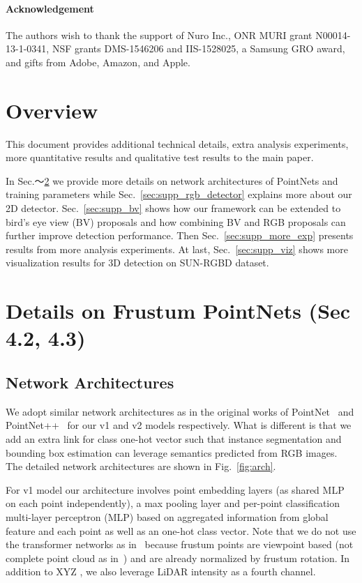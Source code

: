 \documentclass[10pt,twocolumn,letterpaper]{article}
\begin{document}
\paragraph{Acknowledgement}
The authors wish to thank the support of Nuro Inc., ONR MURI grant N00014-13-1-0341, NSF grants DMS-1546206 and  IIS-1528025, a Samsung GRO award, and gifts from Adobe, Amazon, and Apple.



\newpage
{\small


}

\newpage
\appendix
\section{Overview}
This document provides additional technical details, extra analysis experiments, more quantitative results and qualitative test results to the main paper.

In Sec.～\ref{sec:supp_pointnets} we provide more details on network architectures of PointNets and training parameters while Sec.~\ref{sec:supp_rgb_detector} explains more about our 2D detector. Sec.~\ref{sec:supp_bv} shows how our framework can be extended to bird's eye view (BV) proposals and how combining BV and RGB proposals can further improve detection performance. Then Sec.~\ref{sec:supp_more_exp} presents results from more analysis experiments. At last, Sec.~\ref{sec:supp_viz} shows more visualization results for 3D detection on SUN-RGBD dataset.


\section{Details on Frustum PointNets (Sec 4.2, 4.3)}
\label{sec:supp_pointnets}

\subsection{Network Architectures}
We adopt similar network architectures as in the original works of PointNet~\cite{qi2017pointnet} and PointNet++~\cite{qi2017pointnetplusplus} for our v1 and v2 models respectively. What is different is that we add an extra link for class one-hot vector such that instance segmentation and bounding box estimation can leverage semantics predicted from RGB images. The detailed network architectures are shown in Fig.~\ref{fig:arch}.

For v1 model our architecture involves point embedding layers (as shared MLP on each point independently), a max pooling layer and per-point classification multi-layer perceptron (MLP) based on aggregated information from global feature and each point as well as an one-hot class vector. Note that we do not use the transformer networks as in~\cite{qi2017pointnet} because frustum points are viewpoint based (not complete point cloud as in~\cite{qi2017pointnet}) and are already normalized by frustum rotation. In addition to XYZ , we also leverage LiDAR intensity as a fourth channel.
\end{document}

